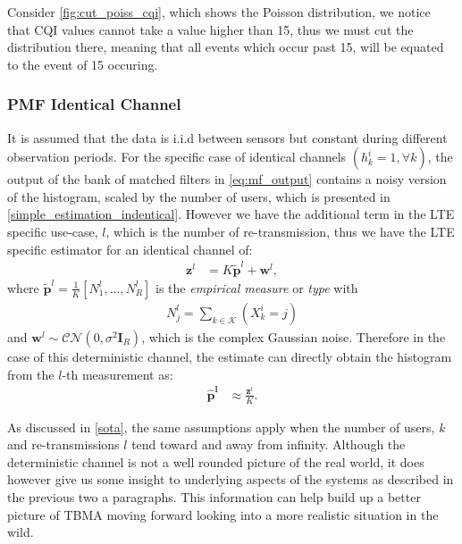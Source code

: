 \documentclass{article}
\begin{document}
Consider \cref{fig:cut_poiss_cqi}, which shows the Poisson distribution, we notice that CQI values cannot take a value higher than 15, thus we must cut the distribution there, meaning that all events which occur past 15, will be equated to the event of 15 occuring. 


\subsubsection{PMF Identical Channel}\label{det_chan}
It is assumed that the data is i.i.d between sensors but constant during different observation periods. For the specific case of identical channels ${(h^i_k = 1, \forall k)}$, the output of the bank of matched filters in \cref{eq:mf_output} contains a noisy version of the histogram, scaled by the number of users, which is presented in \cref{simple_estimation_indentical}. However we have the additional term in the LTE specific use-case, $l$, which is the number of re-transmission, thus we have the LTE specific estimator for an identical channel of:
%
\begin{align}
    \boldsymbol{z}^l &= K \tilde{\boldsymbol{p}}^l + \boldsymbol{w}^l, 
\end{align}
%
where $\tilde{\boldsymbol{p}}^l = \frac{1}{K}[N_1^l, \ldots, N_R^l]$ is the \emph{empirical measure} or \emph{type} with
\begin{align}
    N_j^l = \sum_{k \in \mathcal{K}}(X^i_k = j)
\end{align}
and $\boldsymbol{w}^l \sim \mathcal{CN}(0, {\sigma^2 \boldsymbol{I}_R})$, which is the complex Gaussian noise.
%
Therefore in the case of this deterministic channel, the estimate can directly obtain the histogram from the $l$-th measurement as:
%
\begin{align}
    \boldsymbol{\hat{p}^l} &\approx \frac{\boldsymbol{z}^l}{K}. \label{eq:empf_h_const}
\end{align}

As discussed in \cref{sota}, the same assumptions apply when the number of users, $k$ and re-transmissions $l$ tend toward and away from infinity.
Although the deterministic channel is not a well rounded picture of the real world, it does however give us some insight to underlying aspects of the systems as described in the previous two a paragraphs. This information can help build up a better picture of TBMA moving forward looking into a more realistic situation in the wild.
\end{document}
